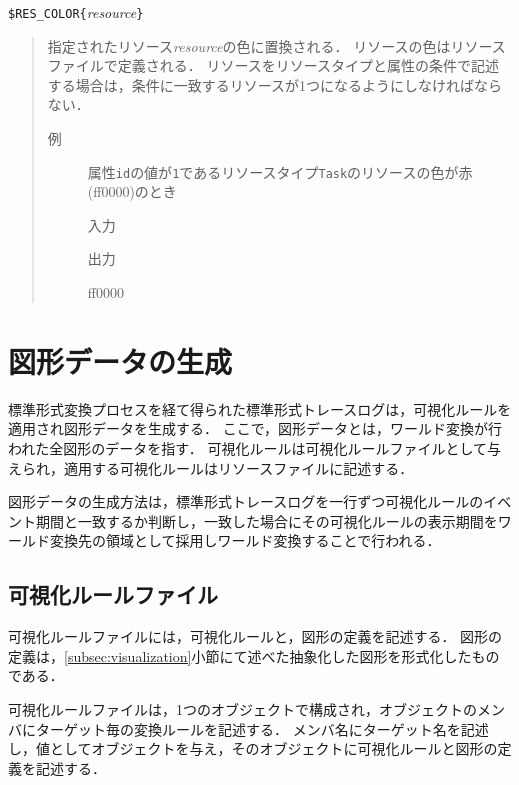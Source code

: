 \verb|$RES_COLOR{|\textit{resource}\verb|}|
\vspace{-1zw}
\begin{quote}
指定されたリソース{\it resource}の色に置換される．
リソースの色はリソースファイルで定義される．
リソースをリソースタイプと属性の条件で記述する場合は，条件に一致するリソースが1つになるようにしなければならない．

\begin{description}
\item[例] 属性{\tt id}の値が{\tt 1}であるリソースタイプ{\tt Task}のリソースの色が赤(ff0000)のとき

\hspace*{-1zw}入力\vspace{-1.75zw}
\hspace*{-1zw}出力\vspace{-1.75zw}
\begin{EBNF}
ff0000
\end{EBNF}
\end{description}

\end{quote}

\section{図形データの生成}

標準形式変換プロセスを経て得られた標準形式トレースログは，可視化ルールを適用され図形データを生成する．
ここで，図形データとは，ワールド変換が行われた全図形のデータを指す．
可視化ルールは可視化ルールファイルとして与えられ，適用する可視化ルールはリソースファイルに記述する．

図形データの生成方法は，標準形式トレースログを一行ずつ可視化ルールのイベント期間と一致するか判断し，一致した場合にその可視化ルールの表示期間をワールド変換先の領域として採用しワールド変換することで行われる．

\subsection{可視化ルールファイル}
可視化ルールファイルには，可視化ルールと，図形の定義を記述する．
図形の定義は，\ref{subsec:visualization}小節にて述べた抽象化した図形を形式化したものである．

可視化ルールファイルは，1つのオブジェクトで構成され，オブジェクトのメンバにターゲット毎の変換ルールを記述する．
メンバ名にターゲット名を記述し，値としてオブジェクトを与え，そのオブジェクトに可視化ルールと図形の定義を記述する．

